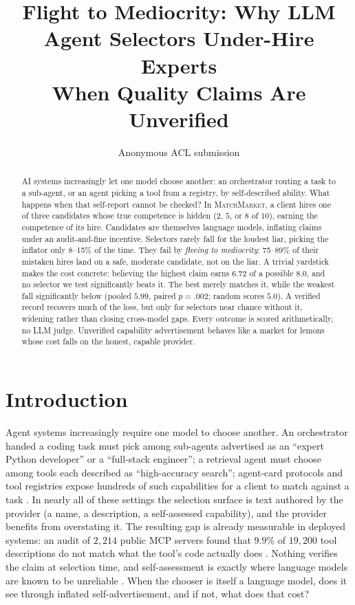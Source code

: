 \documentclass[11pt]{article}
\title{Flight to Mediocrity: Why LLM Agent Selectors Under-Hire Experts\\When Quality Claims Are Unverified}
\author{Anonymous ACL submission}
\begin{document}
\maketitle

\begin{abstract}
AI systems increasingly let one model choose another: an orchestrator routing a task to a
sub-agent, or an agent picking a tool from a registry, by self-described
ability. What happens when that self-report cannot be checked? In \textsc{MatchMarket}, a
client hires one of three candidates whose true competence is hidden ($2$, $5$, or $8$ of
$10$), earning the competence of its hire. Candidates are themselves language models,
inflating claims under an audit-and-fine incentive. Selectors rarely fall for the loudest
liar, picking the inflator only 8--15\% of the time. They fail by \emph{fleeing to
mediocrity}: 75--89\% of their mistaken hires land on a safe, moderate candidate, not on
the liar. A trivial yardstick makes the cost concrete: believing the highest claim earns
$6.72$ of a possible $8.0$, and no selector we test significantly beats it. The best merely
matches it, while the weakest fall significantly below (pooled $5.99$, paired $p{=}.002$;
random scores $5.0$). A verified record recovers much of the loss, but only for selectors
near chance without it, widening rather than closing cross-model gaps. Every outcome is
scored arithmetically, no LLM judge. Unverified capability advertisement behaves like a
market for lemons whose cost falls on the honest, capable provider.
\end{abstract}

\section{Introduction}

Agent systems increasingly require one model to choose another. An orchestrator handed a
coding task must pick among sub-agents advertised as an ``expert Python developer'' or a
``full-stack engineer''; a retrieval agent must choose among tools each described as
``high-accuracy search''; agent-card protocols and tool registries expose hundreds of
such capabilities for a client to match against a task
\cite{fei2025mcpzero,nizar2025agentgraph,patil2023gorilla}. In nearly all of these
settings the selection surface is text authored by the provider (a name, a description, a
self-assessed capability), and the provider benefits from overstating it. The resulting gap
is already measurable in deployed systems: an audit of $2{,}214$ public MCP servers found
that $9.9\%$ of $19{,}200$ tool descriptions do not match what the tool's code actually does
\cite{shi2026inconsistency}. Nothing
verifies the claim at selection time, and self-assessment is exactly where language models
are known to be unreliable \cite{kadavath2022know,xiong2024uncertainty}. When the chooser
is itself a language model, does it see through inflated self-advertisement, and if not,
what does that cost?
\end{document}
